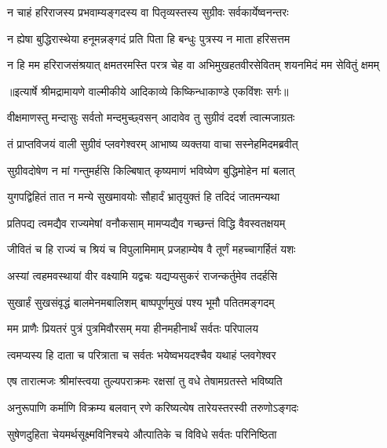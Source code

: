 \twolineshloka
{न चाहं हरिराजस्य प्रभवाम्यङ्गदस्य वा}
{पितृव्यस्तस्य सुग्रीवः सर्वकार्येष्वनन्तरः} %

\twolineshloka
{न ह्येषा बुद्धिरास्थेया हनूमन्नङ्गदं प्रति}
{पिता हि बन्धुः पुत्रस्य न माता हरिसत्तम} %

\fourlineindentedshloka
{न हि मम हरिराजसंश्रयात्}
{क्षमतरमस्ति परत्र चेह वा}
{अभिमुखहतवीरसेवितम्}
{शयनमिदं मम सेवितुं क्षमम्} %


{॥इत्यार्षे श्रीमद्रामायणे वाल्मीकीये आदिकाव्ये किष्किन्धाकाण्डे एकविंशः सर्गः॥}


\twolineshloka
{वीक्षमाणस्तु मन्दासुः सर्वतो मन्दमुच्छ्वसन्}
{आदावेव तु सुग्रीवं ददर्श त्वात्मजाग्रतः} %

\twolineshloka
{तं प्राप्तविजयं वाली सुग्रीवं प्लवगेश्वरम्}
{आभाष्य व्यक्तया वाचा सस्नेहमिदमब्रवीत्} %

\twolineshloka
{सुग्रीवदोषेण न मां गन्तुमर्हसि किल्बिषात्}
{कृष्यमाणं भविष्येण बुद्धिमोहेन मां बलात्} %

\twolineshloka
{युगपद्विहितं तात न मन्ये सुखमावयोः}
{सौहार्दं भ्रातृयुक्तं हि तदिदं जातमन्यथा} %

\twolineshloka
{प्रतिपद्य त्वमद्यैव राज्यमेषां वनौकसाम्}
{मामप्यद्यैव गच्छन्तं विद्धि वैवस्वतक्षयम्} %

\twolineshloka
{जीवितं च हि राज्यं च श्रियं च विपुलामिमाम्}
{प्रजहाम्येष वै तूर्णं महच्चागर्हितं यशः} %

\twolineshloka
{अस्यां त्वहमवस्थायां वीर वक्ष्यामि यद्वचः}
{यद्यप्यसुकरं राजन्कर्तुमेव तदर्हसि} %

\twolineshloka
{सुखार्हं सुखसंवृद्धं बालमेनमबालिशम्}
{बाष्पपूर्णमुखं पश्य भूमौ पतितमङ्गदम्} %

\twolineshloka
{मम प्राणैः प्रियतरं पुत्रं पुत्रमिवौरसम्}
{मया हीनमहीनार्थं सर्वतः परिपालय} %

\twolineshloka
{त्वमप्यस्य हि दाता च परित्राता च सर्वतः}
{भयेष्वभयदश्चैव यथाहं प्लवगेश्वर} %

\twolineshloka
{एष तारात्मजः श्रीमांस्त्वया तुल्यपराक्रमः}
{रक्षसां तु वधे तेषामग्रतस्ते भविष्यति} %

\twolineshloka
{अनुरूपाणि कर्माणि विक्रम्य बलवान् रणे}
{करिष्यत्येष तारेयस्तरस्वी तरुणोऽङ्गदः} %

\twolineshloka
{सुषेणदुहिता चेयमर्थसूक्ष्मविनिश्चये}
{औत्पातिके च विविधे सर्वतः परिनिष्ठिता} %


